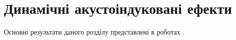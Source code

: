 %
%
%
%
%
%
%
%
%
%
%
%
%
%


\section{Динамічні акустоіндуковані ефекти}


Основні результати даного розділу представлені в роботах \cite{Olikh:SEMT2004,Olikh:SEMT2011,1UNCPS,2013Buk}.


